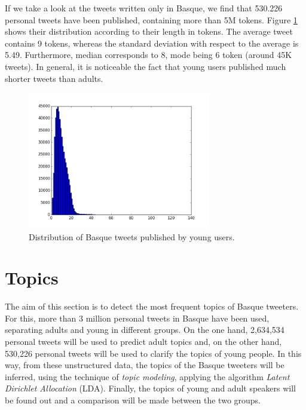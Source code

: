 \documentclass[information,article,submit,moreauthors,pdftex,10pt,a4paper]{Definitions/mdpi}
\begin{document}
If we take a look at the tweets written only in Basque, we find that 530.226 personal tweets have been published, containing more than 5M tokens. Figure  \ref{fig:txio luze gzt} shows their distribution according to their length in tokens. The average tweet contains 9 tokens, whereas the standard deviation with respect to the average is 5.49. Furthermore, median corresponds to 8, mode being 6 token (around 45K tweets). In general, it is noticeable the fact that young users published much shorter tweets than adults.

\begin{figure}[H]
  \centering
  \includegraphics[height=6cm]{graf_inf}
  \caption{Distribution of Basque tweets published by young users.}
  \label{fig:txio luze gzt}
\end{figure}



\section{Topics}\label{sec:topics}

The aim of this section is to detect the most frequent topics of Basque tweeters. For this, more than 3 million personal tweets in Basque have been used, separating adults and young in different groups. On the one hand, 2,634,534 personal tweets will be used to predict adult topics and, on the other hand, 530,226 personal tweets will be used to clarify the topics of young people. In this way, from these unstructured data, the topics of the Basque tweeters will be inferred, using the technique of \textit{topic modeling}, applying the algorithm \textit{Latent Dirichlet Allocation} (LDA). Finally, the topics of young and adult speakers will be found out and a comparison will be made between the two groups.
\end{document}

